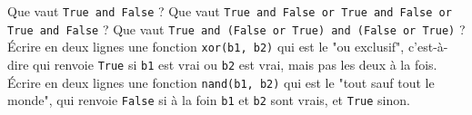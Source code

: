 \quessques Que vaut \texttt{True and False} ?
\ssques Que vaut \texttt{True and False or True and False or True and False} ?
\ssques Que vaut \texttt{True and (False or True) and (False or True)} ?
\ssques Écrire en deux lignes une fonction \texttt{xor(b1, b2)} qui est le "ou exclusif", c'est-à-dire qui renvoie \texttt{True} si \texttt{b1} est vrai ou \texttt{b2} est vrai, mais pas les deux à la fois.
\ssques Écrire en deux lignes une fonction \texttt{nand(b1, b2)} qui est le "tout sauf tout le monde", qui renvoie \texttt{False} si à la foin \texttt{b1} et \texttt{b2} sont vrais, et \texttt{True} sinon.
